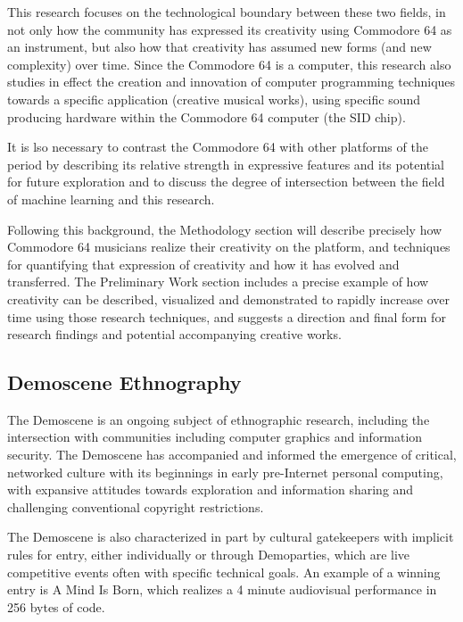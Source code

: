 \documentclass[10pt]{article}
\begin{document}
\begin{multicols*}{2}
This research focuses on the technological boundary between these two fields, in not only how the community has expressed its creativity using Commodore 64 as an instrument, but also how that creativity has assumed new forms (and new complexity) over time. Since the Commodore 64 is a computer, this research also studies in effect the creation and innovation of computer programming techniques towards a specific application (creative musical works), using specific sound producing hardware within the Commodore 64 computer (the SID chip).

It is lso necessary to contrast the Commodore 64 with other platforms of the period by describing its relative strength in expressive features and its potential for future exploration and to discuss the degree of intersection between the field of machine learning and this research.

Following this background, the Methodology section will describe precisely how Commodore 64 musicians realize their creativity on the platform, and techniques for quantifying that expression of creativity and how it has evolved and transferred. The Preliminary Work section includes a precise example of how creativity can be described, visualized and demonstrated to rapidly increase over time using those research techniques, and suggests a direction and final form for research findings and potential accompanying creative works.

\subsection{Demoscene Ethnography}

The Demoscene is an ongoing subject of ethnographic research, including the intersection with communities including computer graphics\cite{siggraphdemo} and information security\cite{layerone}. The Demoscene has accompanied and informed the emergence of critical, networked culture with its beginnings in early pre-Internet personal computing\cite{pioneers}, with expansive attitudes towards exploration and information sharing and challenging conventional copyright restrictions.

The Demoscene is also characterized in part by cultural gatekeepers with implicit rules for entry\cite{gatekeepers}, either individually or through Demoparties, which are live competitive events often with specific technical goals. An example of a winning entry is A Mind Is Born\cite{amib}, which realizes a 4 minute audiovisual performance in 256 bytes of code.


\end{multicols*}
\end{document}
